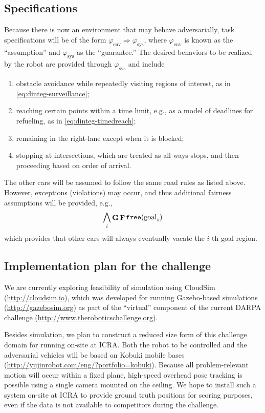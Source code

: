 \documentclass[12pt]{amsart}
\DeclareMathOperator{\Galways}{\mathbf{G}}
\DeclareMathOperator{\Feventually}{\mathbf{F}}
\begin{document}
\subsection{Specifications}

Because there is now an environment that may behave adversarially, task
specifications will be of the form $\varphi_{\mathrm{env}} \Rightarrow
\varphi_{\mathrm{sys}}$, where $\varphi_{\mathrm{env}}$ is known as the
``assumption'' and $\varphi_{\mathrm{sys}}$ as the ``guarantee.''  The desired
behaviors to be realized by the robot are provided through
$\varphi_{\mathrm{sys}}$ and include
\begin{enumerate}
\item obstacle avoidance while repeatedly visiting regions of interest, as in
  \eqref{eq:dinteg-surveillance};

\item reaching certain points within a time limit, e.g., as a model of deadlines
  for refueling, as in \eqref{eq:dinteg-timedreach};

\item remaining in the right-lane except when it is blocked;

\item stopping at intersections, which are treated as all-ways stops, and then
  proceeding based on order of arrival.
\end{enumerate}
The other cars will be assumed to follow the same road rules as listed above.
However, exceptions (violations) may occur, and thus additional fairness
assumptions will be provided, e.g.,
\begin{equation}\label{eq:freegoals}
\bigwedge_i \Galways \Feventually \tt{free}(\mathrm{goal}_i)
\end{equation}
which provides that other cars will always eventually vacate the $i$-th goal
region.

\subsection{Implementation plan for the challenge}

We are currently exploring feasibility of simulation using CloudSim
(\url{http://cloudsim.io}), which was developed for running Gazebo-based
simulations (\url{http://gazebosim.org}) as part of the ``virtual'' component of
the current DARPA challenge (\url{http://www.theroboticschallenge.org}).

Besides simulation, we plan to construct a reduced size form of this challenge
domain for running on-site at ICRA.  Both the robot to be controlled and the
adversarial vehicles will be based on Kobuki mobile bases
(\url{http://yujinrobot.com/eng/?portfolio=kobuki}).  Because all
problem-relevant motion will occur within a fixed plane, high-speed overhead
pose tracking is possible using a single camera mounted on the ceiling.  We hope
to install such a system on-site at ICRA to provide ground truth positions for
scoring purposes, even if the data is not available to competitors during the
challenge.
\end{document}
